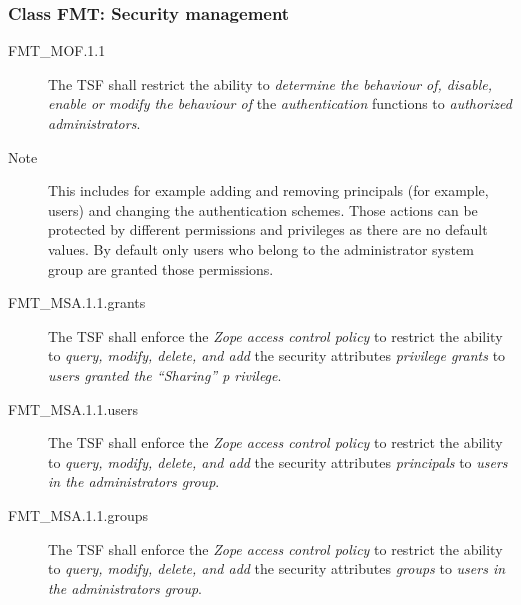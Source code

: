 \documentclass[12pt,english]{scrbook}
\begin{document}



\subsubsection{Class FMT: Security management}





\begin{description}

\item[FMT{\_}MOF.1.1]

The TSF shall restrict the ability to \emph{determine the
behaviour of, disable, enable or modify the behaviour of} the
\emph{authentication} functions to \emph{authorized administrators}.

\item[Note]
This includes for example adding and removing principals (for example,
users) and changing the authentication schemes. Those actions can be
protected by different permissions and privileges as there are no default
values. By default only users who belong to the administrator system group are
granted those permissions.

\end{description}






\begin{description}
\item[FMT{\_}MSA.1.1.grants]
    The TSF shall enforce the \emph{Zope access control policy} to restrict the
    ability to \emph{query, modify, delete, and add} the security
    attributes \emph{privilege grants} to \emph{users granted the ``Sharing''
    p
    rivilege}.
\item[FMT{\_}MSA.1.1.users]
    The TSF shall enforce the \emph{Zope access control policy} to restrict the
    ability to \emph{query, modify, delete, and add} the security
    attributes \emph{principals} to \emph{users in the administrators
    group}.

\item[FMT{\_}MSA.1.1.groups]
    The TSF shall enforce the \emph{Zope access control policy} to restrict the
    ability to \emph{query, modify, delete, and add} the security
    attributes \emph{groups} to \emph{users in the administrators group}.

\end{description}
\end{document}
